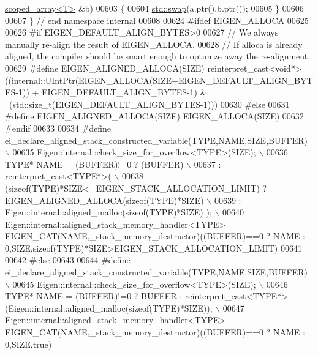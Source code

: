 \begin{DoxyCode}
      \hyperlink{class_eigen_1_1internal_1_1scoped__array}{scoped\_array<T>} &b)
00603 \{
00604   \hyperlink{endian_8c_a3ca5ecd34b04d6a243c054ac3a57f68d}{std::swap}(a.ptr(),b.ptr());
00605 \}
00606     
00607 \} \textcolor{comment}{// end namespace internal}
00608 
00624 \textcolor{preprocessor}{#ifdef EIGEN\_ALLOCA}
00625   
00626 \textcolor{preprocessor}{  #if EIGEN\_DEFAULT\_ALIGN\_BYTES>0}
00627     \textcolor{comment}{// We always manually re-align the result of EIGEN\_ALLOCA.}
00628     \textcolor{comment}{// If alloca is already aligned, the compiler should be smart enough to optimize away the re-alignment.}
00629 \textcolor{preprocessor}{    #define EIGEN\_ALIGNED\_ALLOCA(SIZE)
       reinterpret\_cast<void*>((internal::UIntPtr(EIGEN\_ALLOCA(SIZE+EIGEN\_DEFAULT\_ALIGN\_BYTES-1)) + EIGEN\_DEFAULT\_ALIGN\_BYTES-1) & ~(std::size\_t(EIGEN\_DEFAULT\_ALIGN\_BYTES-1)))}
00630 \textcolor{preprocessor}{  #else}
00631 \textcolor{preprocessor}{    #define EIGEN\_ALIGNED\_ALLOCA(SIZE) EIGEN\_ALLOCA(SIZE)}
00632 \textcolor{preprocessor}{  #endif}
00633 
00634 \textcolor{preprocessor}{  #define ei\_declare\_aligned\_stack\_constructed\_variable(TYPE,NAME,SIZE,BUFFER) \(\backslash\)}
00635 \textcolor{preprocessor}{    Eigen::internal::check\_size\_for\_overflow<TYPE>(SIZE); \(\backslash\)}
00636 \textcolor{preprocessor}{    TYPE* NAME = (BUFFER)!=0 ? (BUFFER) \(\backslash\)}
00637 \textcolor{preprocessor}{               : reinterpret\_cast<TYPE*>( \(\backslash\)}
00638 \textcolor{preprocessor}{                      (sizeof(TYPE)*SIZE<=EIGEN\_STACK\_ALLOCATION\_LIMIT) ?
       EIGEN\_ALIGNED\_ALLOCA(sizeof(TYPE)*SIZE) \(\backslash\)}
00639 \textcolor{preprocessor}{                    : Eigen::internal::aligned\_malloc(sizeof(TYPE)*SIZE) );  \(\backslash\)}
00640 \textcolor{preprocessor}{    Eigen::internal::aligned\_stack\_memory\_handler<TYPE>
       EIGEN\_CAT(NAME,\_stack\_memory\_destructor)((BUFFER)==0 ? NAME : 0,SIZE,sizeof(TYPE)*SIZE>EIGEN\_STACK\_ALLOCATION\_LIMIT)}
00641 
00642 \textcolor{preprocessor}{#else}
00643 
00644 \textcolor{preprocessor}{  #define ei\_declare\_aligned\_stack\_constructed\_variable(TYPE,NAME,SIZE,BUFFER) \(\backslash\)}
00645 \textcolor{preprocessor}{    Eigen::internal::check\_size\_for\_overflow<TYPE>(SIZE); \(\backslash\)}
00646 \textcolor{preprocessor}{    TYPE* NAME = (BUFFER)!=0 ? BUFFER :
       reinterpret\_cast<TYPE*>(Eigen::internal::aligned\_malloc(sizeof(TYPE)*SIZE));    \(\backslash\)}
00647 \textcolor{preprocessor}{    Eigen::internal::aligned\_stack\_memory\_handler<TYPE>
       EIGEN\_CAT(NAME,\_stack\_memory\_destructor)((BUFFER)==0 ? NAME : 0,SIZE,true)}

\end{DoxyCode}

